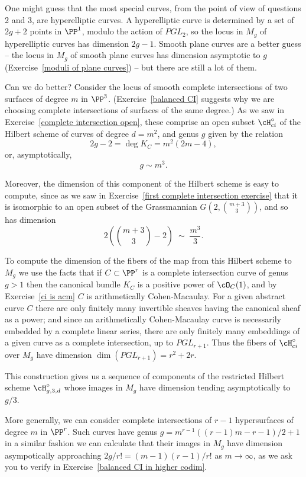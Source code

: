 One might guess that the most special curves, from the point of view of questions 2 and 3, are hyperelliptic curves. A hyperelliptic curve is determined by a set of $2g+2$ points in $\PP^{1}$, modulo the action of $PGL_{2}$, so the locus in $M_g$ of hyperelliptic curves has dimension $2g-1$. Smooth plane curves are a better guess  --  the locus in $M_g$ of smooth plane curves has dimension asymptotic to $g$ (Exercise~\ref{moduli of plane curves}) -- but there are still a lot of them.

Can we do better?  Consider the locus of smooth complete intersections of two surfaces of degree $m$ in $\PP^3$. (Exercise~\ref{balanced CI}  suggests why we are choosing complete intersections of surfaces of the same degree.) As we saw in Exercise~\ref{complete intersection open}, these comprise an open subset $\cH^\circ_{ci}$ of the Hilbert scheme of curves of degree $d = m^2$, and genus $g$ given by the relation
$$
2g-2 = \deg K_C = m^2(2m-4),
$$
or, asymptotically,
$$
g \sim m^3.
$$

Moreover, the dimension of this component of the Hilbert scheme is easy to compute, since as we saw in Exercise~\ref{first complete intersection exercise} that it is isomorphic to an open subset of the Grassmannian $G(2, \binom{m+3}{3})$, and so has dimension
$$
2(\binom{m+3}{3} - 2) \; \sim \; \frac{m^3}{3}.
$$

To compute the dimension of the fibers of the map from this Hilbert scheme to $M_{g}$ we use 
the facts that if $C \subset \PP^r$ is a complete intersection curve of genus $g >1$ then the canonical bundle $K_C$ is a positive power of $\cO_C(1)$, and by Exercise~\ref{ci is acm}  $C$ is arithmetically Cohen-Macaulay.
For a given abstract curve $C$ there are only finitely many invertible sheaves having the canonical sheaf as a power; and since an arithmetically Cohen-Macaulay curve is necessarily embedded by a complete linear series, there are only finitely many embeddings of a given curve as a complete intersection, up to $PGL_{r+1}$. Thus the fibers of $\cH^\circ_{ci}$ over $M_g$ have dimension $\dim(PGL_{r+1}) = r^2 + 2r$.

This construction gives us a sequence of components of the restricted Hilbert scheme $\cH^\circ_{g,3,d}$ whose images in $M_g$ have dimension tending asymptotically to $g/3$.

More generally, we can consider complete intersections of $r-1$ hypersurfaces of degree $m$ in $\PP^r$. Such curves have
genus $g = m^{r-1}((r-1)m-r-1)/2 +1$ in a similar fashion we can calculate that their images in $M_g$ have dimension asympotically approaching $2g/r!= (m-1)(r-1)/r!$
 as $m \to \infty$, as we ask you to verify in Exercise~\ref{balanced CI in higher codim}.


